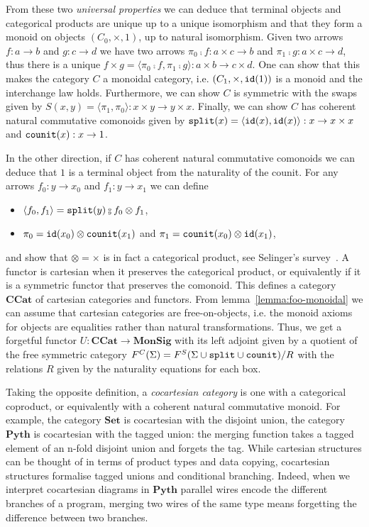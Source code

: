 From these two \emph{universal properties} we can deduce that terminal objects and categorical products are unique up to a unique isomorphism and that they form a monoid on objects $(C_0, \times, 1)$, up to natural isomorphism.
Given two arrows $f : a \to b$ and $g : c \to d$ we have two arrows $\pi_0 \fcmp f : a \times c \to b$ and $\pi_1 \fcmp g : a \times c \to d$, thus there is a unique $f \times  g = \langle \pi_0 \fcmp f, \pi_1 \fcmp g \rangle : a \times b \to c \times d$.
One can show that this makes the category $C$ a monoidal category, i.e. $(C_1, \times, \mathtt{id}(1))$ is a monoid and the interchange law holds.
Furthermore, we can show $C$ is symmetric with the swaps given by $S(x, y) = \langle \pi_1, \pi_0 \rangle : x \times y \to y \times x$.
Finally, we can show $C$ has coherent natural commutative comonoids given by $\mathtt{split}(x) = \langle \mathtt{id}(x), \mathtt{id}(x) \rangle : x \to x \times x$ and $\mathtt{counit}(x) : x \to 1$.

In the other direction, if $C$ has coherent natural commutative comonoids we can deduce that $1$ is a terminal object from the naturality of the counit.
For any arrows $f_0 : y \to x_0$ and $f_1 : y \to x_1$ we can define
\begin{itemize}
\item $\langle f_0, f_1 \rangle = \ttsplit(y) \fcmp f_0 \otimes f_1$,
\item $\pi_0 = \mathtt{id}(x_0) \otimes \mathtt{counit}(x_1)$ and $\pi_1 = \mathtt{counit}(x_0) \otimes \mathtt{id}(x_1)$,
\end{itemize}
and show that $\otimes = \times$ is in fact a categorical product, see Selinger's survey~\cite[Section 6.1]{Selinger10}.
A functor is cartesian when it preserves the categorical product, or equivalently if it is a symmetric functor that preserves the comonoid.
This defines a category $\mathbf{CCat}$ of cartesian categories and functors.
From lemma~\ref{lemma:foo-monoidal} we can assume that cartesian categories are free-on-objects, i.e. the monoid axioms for objects are equalities rather than natural transformations.
Thus, we get a forgetful functor $U : \mathbf{CCat} \to \mathbf{MonSig}$ with its left adjoint given by a quotient of the free symmetric category $F^C(\Sigma) = F^S(\Sigma \cup \mathtt{split} \cup \mathtt{counit}) / R$ with the relations $R$ given by the naturality equations for each box.

Taking the opposite definition, a \emph{cocartesian category} is one with a categorical coproduct, or equivalently with a coherent natural commutative monoid.
For example, the category $\mathbf{Set}$ is cocartesian with the disjoint union, the category $\mathbf{Pyth}$ is cocartesian with the tagged union: the merging function takes a tagged element of an n-fold disjoint union and forgets the tag.
While cartesian structures can be thought of in terms of product types and data copying, cocartesian structures formalise tagged unions and conditional branching.
Indeed, when we interpret cocartesian diagrams in $\mathbf{Pyth}$ parallel wires encode the different branches of a program, merging two wires of the same type means forgetting the difference between two branches.

